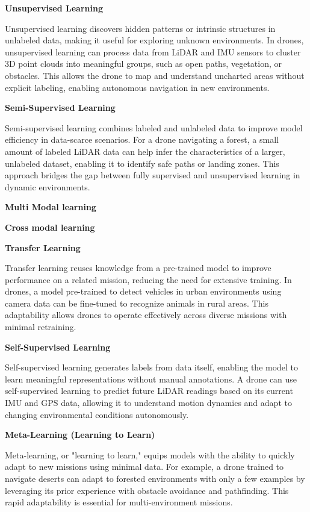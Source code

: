 \documentclass{book}
\providecommand{\ProjectDeepHeading}[2]{%
    \par\medskip\noindent\textbf{#2}\par\smallskip
}
\begin{document}
\ProjectDeepHeading{3}{Unsupervised Learning}
Unsupervised learning discovers hidden patterns or intrinsic structures in unlabeled data, making it useful for exploring unknown environments. In drones, unsupervised learning can process data from LiDAR and IMU sensors to cluster 3D point clouds into meaningful groups, such as open paths, vegetation, or obstacles. This allows the drone to map and understand uncharted areas without explicit labeling, enabling autonomous navigation in new environments. 

\ProjectDeepHeading{3}{Semi-Supervised Learning}
Semi-supervised learning combines labeled and unlabeled data to improve model efficiency in data-scarce scenarios. For a drone navigating a forest, a small amount of labeled LiDAR data can help infer the characteristics of a larger, unlabeled dataset, enabling it to identify safe paths or landing zones. This approach bridges the gap between fully supervised and unsupervised learning in dynamic environments. 

\ProjectDeepHeading{3}{Multi Modal learning}


\ProjectDeepHeading{3}{Cross modal learning}

\ProjectDeepHeading{3}{Transfer Learning}
Transfer learning reuses knowledge from a pre-trained model to improve performance on a related mission, reducing the need for extensive training. In drones, a model pre-trained to detect vehicles in urban environments using camera data can be fine-tuned to recognize animals in rural areas. This adaptability allows drones to operate effectively across diverse missions with minimal retraining.

\ProjectDeepHeading{3}{Self-Supervised Learning}
Self-supervised learning generates labels from data itself, enabling the model to learn meaningful representations without manual annotations. A drone can use self-supervised learning to predict future LiDAR readings based on its current IMU and GPS data, allowing it to understand motion dynamics and adapt to changing environmental conditions autonomously. 

\ProjectDeepHeading{3}{Meta-Learning (Learning to Learn)}
Meta-learning, or "learning to learn," equips models with the ability to quickly adapt to new missions using minimal data. For example, a drone trained to navigate deserts can adapt to forested environments with only a few examples by leveraging its prior experience with obstacle avoidance and pathfinding. This rapid adaptability is essential for multi-environment missions.
\end{document}
